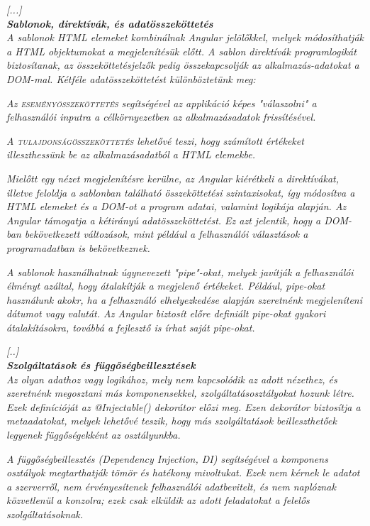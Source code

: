 \textit{[...]}\\

\noindent\textit{\textbf{Sablonok, direktívák, és adatösszeköttetés}}\\

\textit{A sablonok HTML elemeket kombinálnak Angular jelölőkkel, melyek módosíthatják a HTML objektumokat a megjelenítésük előtt. A sablon direktívák programlogikát biztosítanak, az összeköttetésjelzők pedig összekapcsolják az alkalmazás-adatokat a DOM-mal. Kétféle adatösszeköttetést különböztetünk meg:}

\textit{Az \textsc{eseményösszeköttetés} segítségével az applikáció képes "válaszolni" a felhasználói inputra a célkörnyezetben az alkalmazásadatok frissítésével.}

\textit{A \textsc{tulajdonságösszeköttetés} lehetővé teszi, hogy számított értékeket illeszthessünk be az alkalmazásadatból a HTML elemekbe.}

\textit{Mielőtt egy nézet megjelenítésre kerülne, az Angular kiérétkeli a direktívákat, illetve feloldja a sablonban található összeköttetési szintaxisokat, így módosítva a HTML elemeket és a DOM-ot a program adatai, valamint logikája alapján. Az Angular támogatja a kétirányú adatösszeköttetést. Ez azt jelentik, hogy a DOM-ban bekövetkezett változások, mint például a felhasználói választások a programadatban is bekövetkeznek.}

\textit{A sablonok használhatnak úgynevezett "pipe"-okat, melyek javítják a felhasználói élményt azáltal, hogy átalakítják a megjelenő értékeket. Például, pipe-okat használunk akokr, ha a felhasználó elhelyezkedése alapján szeretnénk megjeleníteni dátumot vagy valutát. Az Angular biztosít előre definiált pipe-okat gyakori átalakításokra, továbbá a fejlesztő is írhat saját pipe-okat.}

\textit{[..]}\\

\noindent\textit{\textbf{Szolgáltatások és függőségbeillesztések}}\\

\textit{Az olyan adathoz vagy logikához, mely nem kapcsolódik az adott nézethez, és szeretnénk megosztani más komponensekkel, szolgáltatásosztályokat hozunk létre. Ezek definícióját az @Injectable() dekorátor előzi meg. Ezen dekorátor biztosítja a metaadatokat, melyek lehetővé teszik, hogy más szolgáltatások beilleszthetőek legyenek függőségekként az osztályunkba.}

\textit{A függőségbeillesztés (Dependency Injection, DI) segítségével a komponens osztályok megtarthatják tömör és hatékony mivoltukat. Ezek nem kérnek le adatot a szerverről, nem érvényesítenek felhasználói adatbevitelt, és nem naplóznak közvetlenül a konzolra; ezek csak elküldik az adott feladatokat a felelős szolgáltatásoknak.}

